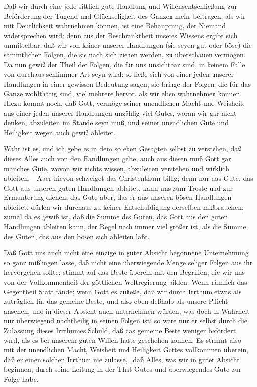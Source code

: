 \begin{aufza}
\item Daß wir durch eine jede sittlich gute Handlung und Willensentschließung zur Beförderung der Tugend und Glückseligkeit des Ganzen mehr beitragen, als wir mit Deutlichkeit wahrnehmen können, ist eine Behauptung, der Niemand widersprechen wird; denn aus der Beschränktheit unseres Wissens ergibt sich unmittelbar, daß wir von keiner unserer Handlungen (sie seyen gut oder böse) die sämmtlichen Folgen, die sie nach sich ziehen werden, zu überschauen vermögen. Da nun gewiß der Theil der Folgen, die für uns unsichtbar sind, in keinem Falle von durchaus schlimmer Art seyn wird: so ließe sich von einer jeden unserer Handlungen in einer gewissen Bedeutung sagen, sie bringe der Folgen, die für das Ganze wohlthätig sind, viel mehrere hervor, als wir eben wahrnehmen können. Hiezu kommt noch, daß Gott, vermöge seiner unendlichen Macht und Weisheit, aus einer jeden unserer Handlungen unzählig viel Gutes, woran wir gar nicht denken, abzuleiten im Stande seyn muß, und seiner unendlichen Güte und Heiligkeit wegen auch gewiß ableitet.
\begin{RWanm} 
Wahr ist es, und ich gebe es in dem so eben Gesagten selbst zu verstehen, daß dieses Alles auch von den  Handlungen gelte; auch aus diesen muß Gott gar manches Gute, wovon wir nichts wissen, abzuleiten verstehen und wirklich ableiten.~\ Aber hievon schweiget das Christenthum billig; denn nur das Gute, das Gott aus unseren guten Handlungen ableitet, kann uns zum Troste und zur Ermunterung dienen; das Gute aber, das er aus unseren bösen Handlungen ableitet, dürfen wir durchaus zu keiner Entschuldigung derselben mißbrauchen; zumal da es gewiß ist, daß die Summe des Guten, das Gott aus den guten Handlungen ableiten kann, der Regel nach immer viel größer ist, als die Summe des Guten, das aus den bösen sich ableiten läßt. 
\end{RWanm}
\item Daß Gott uns auch nicht eine einzige in guter Absicht begonnene Unternehmung so ganz mißlingen lasse, daß nicht eine überwiegende Menge seliger Folgen aus ihr hervorgehen sollte: stimmt auf das Beste überein mit den Begriffen, die wir uns von der Vollkommenheit der göttlichen Weltregierung bilden. Wenn nämlich das Gegentheil Statt fände; wenn Gott es zuließe, daß wir durch Irrthum etwas als zuträglich für das gemeine Beste, und also eben deßhalb als unsere Pflicht ansehen, und in dieser Absicht auch unternehmen würden, was doch in Wahrheit nur überwiegend nachtheilig in seinen Folgen ist: so wäre nur er selbst durch die Zulassung dieses Irrthumes Schuld, daß das gemeine Beste weniger befördert wird, als es bei unserem guten Willen hätte geschehen können. Es stimmt also mit der unendlichen Macht, Weisheit und Heiligkeit Gottes vollkommen überein, daß er einen solchen Irrthum nie zulasse, \dh\ daß Alles, was wir in guter Absicht beginnen, durch seine Leitung in der That Gutes und überwiegendes Gute zur Folge habe.

\end{aufza}
